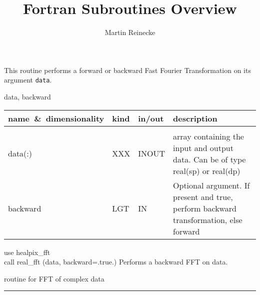 \sloppy

\title{\healpix Fortran Subroutines Overview}
 \section[real\_fft]{ }
\label{sub:real_fft}
\author{Martin Reinecke}

\begin{facility}
{This routine performs a forward or backward Fast Fourier Transformation
on its argument {\tt data}.}
{\modHealpixFft}
\end{facility}

\begin{f90format}
{data, backward}
\end{f90format}

\begin{arguments}
{
\begin{tabular}{p{0.3\hsize} p{0.05\hsize} p{0.1\hsize} p{0.45\hsize}} \hline  
\textbf{name~\&~dimensionality} & \textbf{kind} & \textbf{in/out} & \textbf{description} \\ \hline
                   &   &   &                           \\ %
data(:) & XXX & INOUT &
  array containing the input and output data.
  Can be of type real(sp) or real(dp) \\
backward & LGT & IN & Optional argument. If present and true, perform backward transformation, else forward 
\end{tabular}}
\end{arguments}

\begin{example}
{
use healpix\_fft \\
call real\_fft (data, backward=.true.)
}
{
Performs a backward FFT on data.
}
\end{example}

\begin{related}
  \begin{sulist}{} %
  \item[\htmlref{complex\_fft}{sub:complex_fft}] routine for FFT of complex data
  \end{sulist}
\end{related}

\rule{\hsize}{2mm}

\newpage
